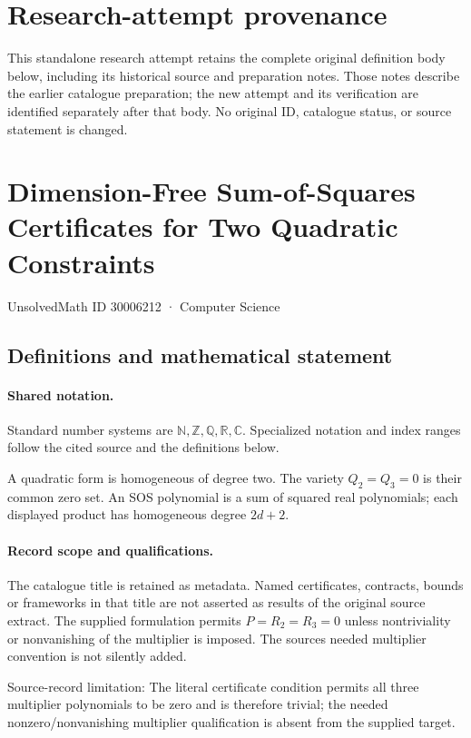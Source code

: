 \documentclass[11pt]{article}
\begin{document}
\section*{Research-attempt provenance}
This standalone research attempt retains the complete original definition body below,
including its historical source and preparation notes. Those notes describe the
earlier catalogue preparation; the new attempt and its verification are identified
separately after that body. No original ID, catalogue status, or source statement is changed.

\section{Dimension-Free Sum-of-Squares Certificates for Two Quadratic Constraints}\label{30006212}
{\small UnsolvedMath ID 30006212 · Computer Science}
\subsection{Definitions and mathematical statement}

\paragraph{Shared notation.}Standard number systems are $\mathbb N,\mathbb Z,\mathbb Q,\mathbb R,\mathbb C$. Specialized notation and index ranges follow the cited source and the definitions below.


A quadratic form is homogeneous of degree two. The variety $Q_2=Q_3=0$ is their common zero set. An SOS polynomial is a sum of squared real polynomials; each displayed product has homogeneous degree $2d+2$.
\paragraph{Record scope and qualifications.}
The catalogue title is retained as metadata. Named certificates, contracts, bounds or frameworks in that title are not asserted as results of the original source extract.
The supplied formulation permits $P=R_2=R_3=0$ unless nontriviality or nonvanishing of the multiplier is imposed. The source\textquotesingle s needed multiplier convention is not silently added.

Source-record limitation: The literal certificate condition permits all three multiplier polynomials to be zero and is therefore trivial; the needed nonzero/nonvanishing multiplier qualification is absent from the supplied target.
\end{document}
